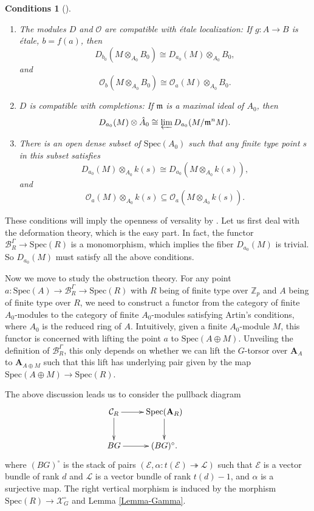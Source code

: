 \documentclass[10pt]{article}
\newtheorem{cond}[thm]{Conditions}
\numberwithin{equation}{section}
\newcommand{\frakm}{{\mathfrak m}}
\newcommand{\bZ}{{\mathbb Z}}
\newcommand{\calB}{{\mathcal B}}
\newcommand{\calC}{{\mathcal C}}
\newcommand{\calE}{{\mathcal E}}
\newcommand{\calL}{{\mathcal L}}
\newcommand{\calO}{{\mathcal O}}
\newcommand{\calX}{{\mathcal X}}
\newcommand{\Spec}{{\mathrm{Spec}}}         %
\newcommand{\bfA}{{\textbf{A}}}
\begin{document}
\begin{cond}[{\cite[4.1]{Art74}}]\label{Artin-condition}
    \begin{enumerate}
    \item The modules $D$ and $\calO$ are compatible with \'etale localization: If $g:A\to B$ is \'etale, $b=f(a)$, then
    \[
    D_{b_0}(M\otimes_{A_0} B_0)\cong D_{a_0}(M)\otimes_{A_0} B_0,
    \]
    and
    \[
    \calO_b(M\otimes_{A_0} B_0)\cong \calO_a(M)\otimes_{A_0} B_0.
    \]
    
    \item $D$ is compatible with completions: If $\frakm$ is a maximal ideal of $A_0$, then
    \[
    D_{a_0}(M)\otimes \hat A_0\cong \varprojlim D_{a_0}(M/\frakm^nM).
    \]
    \item  There is an open dense subset of $\Spec(A_0)$ such that any finite type point $s$ in this subset satisfies 
    \[
    D_{a_0}(M)\otimes_{A_0} k(s)\cong D_{a_0}(M\otimes_{A_0} k(s)),
    \]
    and 
    \[
    \calO_a(M)\otimes_{A_0} k(s)\subseteq \calO_a(M\otimes_{A_0} k(s)).
    \]
\end{enumerate}
\end{cond}


These conditions will imply the openness of versality by \cite[Theorem 4.4]{Art74}. Let us first deal with the deformation theory, which is the easy part. In fact, the functor $\calB_R^{\Gamma}\to \Spec(R)$ is a monomorphism, which implies the fiber $D_{a_0}(M)$ is trivial. So $D_{a_0}(M)$ must satisfy all the above conditions. 

Now we move to study the obstruction theory. 
For any point $a:\Spec(A)\to \calB_R^{\Gamma}\to \Spec(R)$ with $R$ being of finite type over $\bZ_p$ and $A$ being of finite type over $R$, we need to construct a functor from the category of finite $A_0$-modules to the category of finite $A_0$-modules satisfying Artin's conditions, where $A_0$ is the reduced ring of $A$. Intuitively, given a finite $A_0$-module $M$, this functor is concerned with lifting the point $a$ to $\Spec(A\oplus M)$. Unveiling the definition of $\calB_R^{\Gamma}$, this only depends on whether we can lift the $G$-torsor over $\bfA_{A}$ to $\bfA_{A\oplus M}$ such that this lift has underlying pair given by the map $\Spec(A\oplus M)\to \Spec(R)$.

The above discussion leads us to consider the pullback diagram
\begin{equation*}
    \xymatrix{
    \calC_R\ar[r]\ar[d]&\Spec(\bfA_R)\ar[d]&\\
    BG\ar[r]&(BG)^{\circ}.
    }
\end{equation*}
where $(BG)^{\circ}$ is the stack of pairs $(\calE,\alpha:t(\calE)\twoheadrightarrow\calL)$ such that $\calE$ is a vector bundle of rank $d$ and $\calL$ is a vector bundle of rank $t(d)-1$, and $\alpha$ is a surjective map. The right vertical morphism is induced by the morphism $\Spec(R)\to \calX_G^{\circ}$ and Lemma \ref{Lemma-Gamma}.
\end{document}
